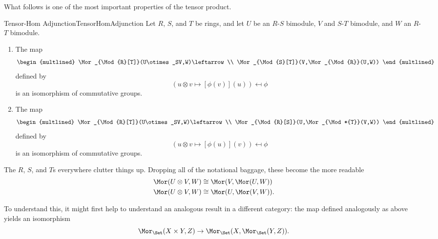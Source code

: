 What follows is one of the most important properties of the tensor product.
\begin{thm}{Tensor-Hom Adjunction}{TensorHomAdjunction}
	Let $R$, $S$, and $T$ be rings, and let $U$ be an $R$-$S$ bimodule, $V$ and $S$-$T$ bimodule, and $W$ an $R$-$T$ bimodule.
	\begin{enumerate}
		\item \label{TensorHomAdjunction(i)}The map
		\begin{equation}\label{eqn5.3.7}
		\begin{multlined}
		\Mor _{\Mod{R}[T]}(U\otimes _SV,W)\leftarrow \\ \Mor _{\Mod{S}[T]}(V,\Mor _{\Mod{R}}(U,W))
		\end{multlined}
		\end{equation}
		defined by
		\begin{equation}\label{eqn5.3.8}
		(u\otimes v\mapsto [\phi (v)](u))\mapsfrom \phi
		\end{equation}
		is an isomorphism of commutative groups.
		\item \label{TensorHomAdjunction(ii)}The map
		\begin{equation}\label{eqn5.3.9}
		\begin{multlined}
		\Mor _{\Mod{R}[T]}(U\otimes _SV,W)\leftarrow \\ \Mor _{\Mod{R}[S]}(U,\Mor _{\Mod*{T}}(V,W))
		\end{multlined}
		\end{equation}
		defined by
		\begin{equation}
		(u\otimes v\mapsto [\phi (u)](v))\mapsfrom \phi
		\end{equation}
		is an isomorphism of commutative groups.
	\end{enumerate}
	\begin{rmk}
		The $R$, $S$, and $T$s everywhere clutter things up.  Dropping all of the notational baggage, these become the more readable
		\begin{align*}
		\Mor (U\otimes V,W) & \cong \Mor (V,\Mor (U,W)) \\
		\Mor (U\otimes V,W) & \cong \Mor (U,\Mor (V,W)).
		\end{align*}
	\end{rmk}
	\begin{rmk}
		To understand this, it might first help to understand an analogous result in a different category:  the map defined analogously as above yields an isomorphism
		\begin{equation*}
		\Mor _{\Set}(X\times Y,Z)\rightarrow \Mor _{\Set}(X,\Mor _{\Set}(Y,Z)).

\end{equation*}
\end{rmk}
\end{thm}
